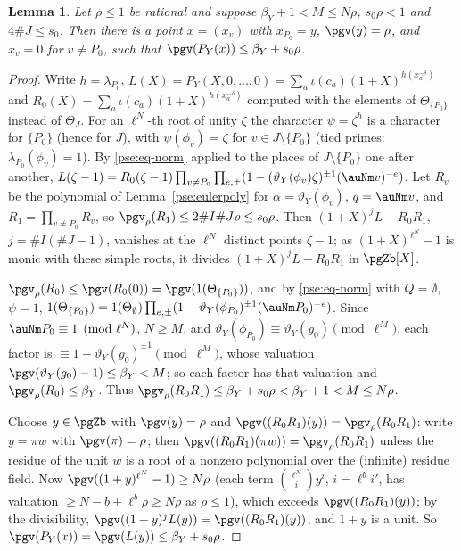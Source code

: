 \documentclass[10pt]{amsart}
\newtheorem{lemma}[theorem]{Lemma}
\theoremstyle{definition}
\theoremstyle{remark}
\begin{document}
\begin{lemma}\label{pse:line}
Let $\rho\le1$ be rational and suppose $\beta_Y+1<M\le N\rho$, $s_0\rho<1$ and $4\#J\le s_0$. Then there is a
point $x=(x_v)$ with $x_{P_0}=y$, $\pgv(y)=\rho$, and $x_v=0$ for $v\ne P_0$, such that
$\pgv(P_Y(x))\le\beta_Y+s_0\rho$.
\end{lemma}
\begin{proof}
Write $h=\lambda_{P_0}$, $L(X)=P_Y(X,0,\dots,0)=\sum_a\iota(c_a)(1+X)^{h(x_a^{-\delta})}$ and
$R_0(X)=\sum_a\iota(c_a)(1+X)^{h(x_a^{-\delta})}$ computed with the elements of $\Theta_{\{P_0\}}$
instead of $\Theta_J$. For an $\ell^N$-th root of unity $\zeta$ the character $\psi=\zeta^{h}$ is a
character for $\{P_0\}$ (hence for $J$), with $\psi(\phi_v)=\zeta$ for $v\in J\setminus\{P_0\}$
(tied primes: $\lambda_{P_0}(\phi_v)=1$). By \eqref{pse:eq-norm} applied to the places of
$J\setminus\{P_0\}$ one after another, $L(\zeta-1)=R_0(\zeta-1)\prod_{v\ne P_0}\prod_{e,\pm}(1-
(\vartheta_Y(\phi_v)\zeta)^{\pm1}(\auNm v)^{-e})$. Let $R_v$ be the polynomial of
Lemma~\ref{pse:eulerpoly} for $\alpha=\vartheta_Y(\phi_v)$, $q=\auNm v$, and $R_1=\prod_{v\ne P_0}
R_v$, so $\pgv_\rho(R_1)\le2\#I\#J\rho\le s_0\rho$. Then $(1+X)^{j}L-R_0R_1$, $j=\#I(\#J-1)$,
vanishes at the $\ell^N$ distinct points $\zeta-1$; as $(1+X)^{\ell^N}-1$ is monic with these simple
roots, it divides $(1+X)^jL-R_0R_1$ in $\pgZb[X]$.

$\pgv_\rho(R_0)\le\pgv(R_0(0))=\pgv(1(\Theta_{\{P_0\}}))$, and by \eqref{pse:eq-norm} with $Q=
\emptyset$, $\psi=1$, $1(\Theta_{\{P_0\}})=1(\Theta_\emptyset)\prod_{e,\pm}(1-\vartheta_Y(\phi_{P_0})^{
\pm1}(\auNm P_0)^{-e})$. Since $\auNm P_0\equiv1\pmod{\ell^N}$, $N\ge M$, and $\vartheta_Y(
\phi_{P_0})\equiv\vartheta_Y(g_0)\pmod{\ell^M}$, each factor is $\equiv1-\vartheta_Y(g_0)^{\pm1}
\pmod{\ell^M}$, whose valuation $\pgv(\vartheta_Y(g_0)-1)\le\beta_Y<M$; so each factor has that
valuation and $\pgv_\rho(R_0)\le\beta_Y$. Thus $\pgv_\rho(R_0R_1)\le\beta_Y+s_0\rho<\beta_Y+1<
M\le N\rho$.

Choose $y\in\pgZb$ with $\pgv(y)=\rho$ and $\pgv((R_0R_1)(y))=\pgv_\rho(R_0R_1)$: write $y=\pi w$
with $\pgv(\pi)=\rho$; then $\pgv((R_0R_1)(\pi w))=\pgv_\rho(R_0R_1)$ unless the residue of the unit
$w$ is a root of a nonzero polynomial over the (infinite) residue field. Now $\pgv((1+y)^{\ell^N}-1)
\ge N\rho$ (each term $\binom{\ell^N}{i}y^i$, $i=\ell^bi'$, has valuation $\ge N-b+\ell^b\rho\ge
N\rho$ as $\rho\le1$), which exceeds $\pgv((R_0R_1)(y))$; by the divisibility,
$\pgv((1+y)^jL(y))=\pgv((R_0R_1)(y))$, and $1+y$ is a unit. So $\pgv(P_Y(x))=\pgv(L(y))\le
\beta_Y+s_0\rho$.
\end{proof}
\end{document}
